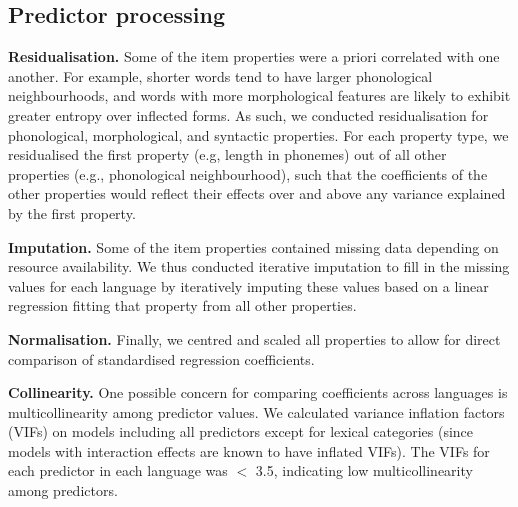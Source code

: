 \documentclass[10pt, letterpaper]{article}
\begin{document}
\hypertarget{predictor-processing}{%
\subsection{Predictor processing}\label{predictor-processing}}

\textbf{Residualisation.} Some of the item properties were a priori
correlated with one another. For example, shorter words tend to have
larger phonological neighbourhoods, and words with more morphological
features are likely to exhibit greater entropy over inflected forms. As
such, we conducted residualisation for phonological, morphological, and
syntactic properties. For each property type, we residualised the first
property (e.g, length in phonemes) out of all other properties (e.g.,
phonological neighbourhood), such that the coefficients of the other
properties would reflect their effects over and above any variance
explained by the first property.

\textbf{Imputation.} Some of the item properties contained missing data
depending on resource availability. We thus conducted iterative
imputation to fill in the missing values for each language by
iteratively imputing these values based on a linear regression fitting
that property from all other properties.

\textbf{Normalisation.} Finally, we centred and scaled all properties to
allow for direct comparison of standardised regression coefficients.

\textbf{Collinearity.} One possible concern for comparing coefficients
across languages is multicollinearity among predictor values. We
calculated variance inflation factors (VIFs) on models including all
predictors except for lexical categories (since models with interaction
effects are known to have inflated VIFs). The VIFs for each predictor in
each language was \(<\) 3.5, indicating low multicollinearity among
predictors.
\end{document}
